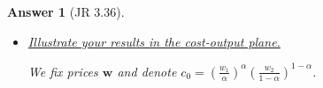 \documentclass{article}
\newtheorem*{ans}{Answer}
\newcommand{\1}{{\bf 1}}
\newcommand{\0}{{\mathbf{0}}}
\newcommand{\w}{{\mathbf{w}}}
\newcommand{\<}{\langle}
\renewcommand{\>}{\rangle}
\begin{document}
\begin{ans}[JR 3.36]
\begin{itemize}
	Notice $\frac{1-\alpha}{\alpha} >0$, hence
\begin{eqnarray*}
&& \min_{ x_2 \ge 0}		sac(y; \w , x_2) \\
& = & \frac1y \min_{ x_2 \ge 0} sc(\w  ; y, x_2)   = \frac1y  \min_{ x_2 \ge 0} \left[w_2 x_2  + w_1 y^{\frac1{\alpha}} x_2^{ - \frac{ 1- \alpha }{\alpha} }\right] \\
& \xlongequal{ x_2 \leftarrow  \left( \frac{1 - \alpha }{ \alpha} \frac{w_1}{w_2 } \right)^{\alpha } y } & \frac1y \cdot w_1^{\alpha }w_2^{1 - \alpha } y \left[\left( \frac{1 - \alpha}\alpha \right)^\alpha + \left(\frac{\alpha }{1 - \alpha}\right)^{1  - \alpha} \right] \\
& = &  \left(\frac{w_1}{\alpha }\right)^{\alpha } \left(\frac{w_2}{1 - \alpha}\right)^{1 - \alpha }, 
\end{eqnarray*}
\begin{eqnarray*}
	&&\min_{ x_1 \ge 0}sac( y;\w, x_1) \\
	&= &\frac1y \min_{ x_1 \ge 0} sac( y;\w , x_1) = \frac1y \min_{ x_1 \ge 0} \left[w_1x_1  + w_2 y^{\frac1{1 - \alpha}} x_1^{ - \frac{ \alpha}{1 - \alpha} }\right] \\
	& \xlongequal{x_1 \leftarrow \left(\frac{\alpha}{1 - \alpha }\frac{w_2}{2_1}\right)^{1 - \alpha } y} & \frac1y \cdot w_1^{\alpha }w_2^{1 - \alpha } y \left[\left( \frac{1 - \alpha}\alpha \right)^\alpha + \left(\frac{\alpha }{1 - \alpha}\right)^{1  - \alpha} \right] \\
	& = &  \left(\frac{w_1}{\alpha }\right)^{\alpha } \left(\frac{w_2}{1 - \alpha}\right)^{1 - \alpha }. 
\end{eqnarray*}

	\item \ul{Illustrate your results in the cost-output plane.}
	
	We fix prices $\w$ and denote $c_0 = \left(\frac{w_1}{\alpha }\right)^{\alpha } \left(\frac{w_2}{1 - \alpha}\right)^{1 - \alpha }$.
	
	
	\newpage
\end{itemize}
\end{ans}
\end{document}
